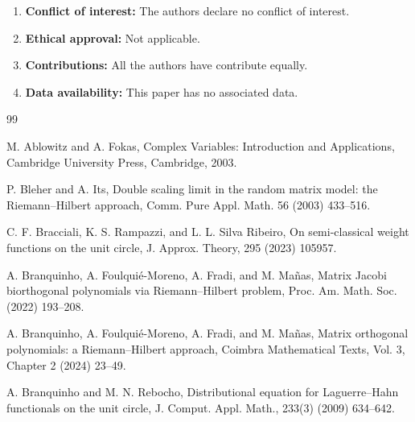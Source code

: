 \documentclass[12pt]{amsart}
\begin{document}
\begin{enumerate}[\rm 1)]
 \item \textbf{Conflict of interest:} 
 The authors declare no conflict of interest.
 \item \textbf{Ethical approval:} 
 Not applicable.
 \item \textbf{Contributions:} 
 All the authors have contribute equally.
 \item \textbf{Data availability:} 
 This paper has no associated data.
\end{enumerate}







\begin{thebibliography}{99}


M. Ablowitz and A. Fokas, 
Complex Variables: Introduction and Applications, 
Cambridge University Press, Cambridge, 2003.






P. Bleher and A. Its, 
Double scaling limit in the random matrix model: the Riemann--Hilbert approach, 
Comm. Pure Appl. Math. 56 (2003) 433--516.


C. F. Bracciali, K. S. Rampazzi, and L. L. Silva Ribeiro, 
On semi-classical weight functions on the unit circle, J. Approx. Theory, 295 (2023) 105957. 


A. Branquinho, A. Foulqui\'e-Moreno, A. Fradi, and M. Ma\~nas, 
Matrix Jacobi biorthogonal polynomials via Riemann--Hilbert problem,
Proc. Am. Math. Soc. (2022) 193--208.

A. Branquinho, A. Foulqui\'e-Moreno, A. Fradi, and M. Ma\~nas,
Matrix orthogonal polynomials: a Riemann--Hilbert approach,
Coimbra Mathematical Texts, Vol. 3, Chapter 2 (2024) 23--49.

 
A. Branquinho and M. N. Rebocho,
Distributional equation for Laguerre--Hahn functionals on the unit circle,
J. Comput. Appl. Math., 233(3) (2009) 634--642.



\end{thebibliography}
\end{document}

